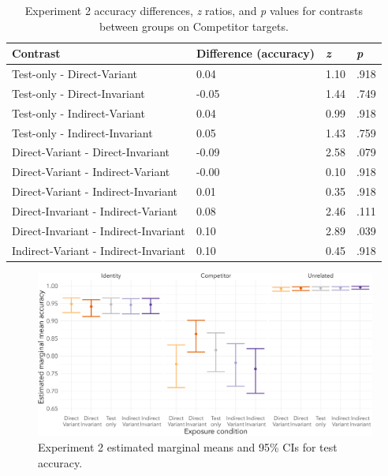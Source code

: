 \documentclass[
  12pt,
  twoside]{article}
\begin{document}
\begin{table}

\caption{\label{tab:exp2-test-tab}Experiment 2 accuracy differences, \textit{z} ratios, and \textit{p} values for contrasts between groups on Competitor targets.}
\centering
\begin{tabular}[t]{l|l|l|l}
\hline
Contrast & Difference (accuracy) & \textit{z} & \textit{p}\\
\hline
Test-only - Direct-Variant & 0.04 & 1.10 & .918\\
\hline
Test-only - Direct-Invariant & -0.05 & 1.44 & .749\\
\hline
Test-only - Indirect-Variant & 0.04 & 0.99 & .918\\
\hline
Test-only - Indirect-Invariant & 0.05 & 1.43 & .759\\
\hline
Direct-Variant - Direct-Invariant & -0.09 & 2.58 & .079\\
\hline
Direct-Variant - Indirect-Variant & -0.00 & 0.10 & .918\\
\hline
Direct-Variant - Indirect-Invariant & 0.01 & 0.35 & .918\\
\hline
Direct-Invariant - Indirect-Variant & 0.08 & 2.46 & .111\\
\hline
Direct-Invariant - Indirect-Invariant & 0.10 & 2.89 & .039\\
\hline
Indirect-Variant - Indirect-Invariant & 0.10 & 0.45 & .918\\
\hline
\end{tabular}
\end{table}

\begin{figure}[H]

{\centering \includegraphics[width=\textwidth]{sections/code/outputs/train_plot_1b} 

}

\caption{Experiment 2 estimated marginal means and 95\% CIs for test accuracy.}\label{fig:exp2-test-fig}
\end{figure}
\end{document}
